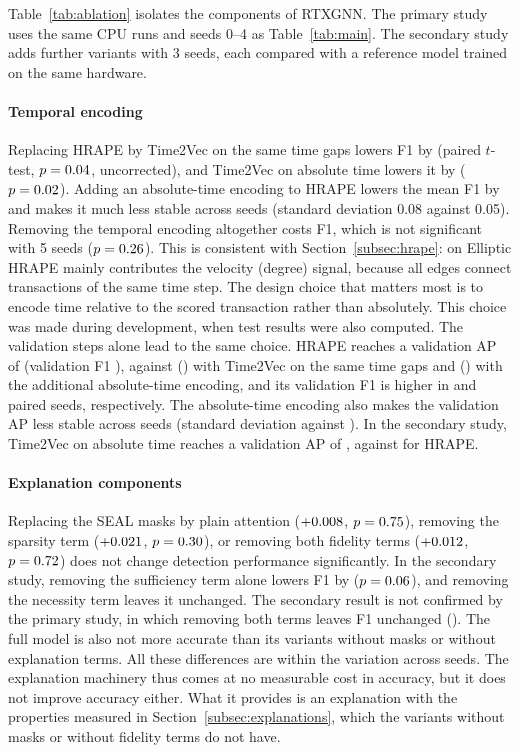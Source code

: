 Table~\ref{tab:ablation} isolates the components of RTXGNN. The primary study uses the same CPU runs and seeds 0--4 as Table~\ref{tab:main}. The secondary study adds further variants with 3 seeds, each compared with a reference model trained on the same hardware.

\paragraph{Temporal encoding} Replacing HRAPE by Time2Vec on the same time gaps lowers F1 by \abltimeTwovecDelta{} (paired $t$-test, $p=0.04$, uncorrected), and Time2Vec on absolute time lowers it by \ablGtimeTwovecabsDelta{} ($p=0.02$). Adding an absolute-time encoding to HRAPE lowers the mean F1 by \ablhrapeabsDelta{} and makes it much less stable across seeds (standard deviation 0.08 against 0.05). Removing the temporal encoding altogether costs \ablnohrapeDelta{} F1, which is not significant with 5 seeds ($p=0.26$). This is consistent with Section~\ref{subsec:hrape}: on Elliptic HRAPE mainly contributes the velocity (degree) signal, because all edges connect transactions of the same time step. The design choice that matters most is to encode time relative to the scored transaction rather than absolutely. This choice was made during development, when test results were also computed. The validation steps alone lead to the same choice. HRAPE reaches a validation AP of \valAPfull{} (validation F1 \valFonefull), against \valAPtimeTwovec{} (\valFonetimeTwovec) with Time2Vec on the same time gaps and \valAPhrapeabs{} (\valFonehrapeabs) with the additional absolute-time encoding, and its validation F1 is higher in \valWinstimeTwovec{} and \valWinshrapeabs{} paired seeds, respectively. The absolute-time encoding also makes the validation AP less stable across seeds (standard deviation \valAPsdhrapeabs{} against \valAPsdfull). In the secondary study, Time2Vec on absolute time reaches a validation AP of \valGAPtimeTwovecabs{}, against \valGAPfull{} for HRAPE.

\paragraph{Explanation components} Replacing the SEAL masks by plain attention ($+0.008$, $p=0.75$), removing the sparsity term ($+0.021$, $p=0.30$), or removing both fidelity terms ($+0.012$, $p=0.72$) does not change detection performance significantly. In the secondary study, removing the sufficiency term alone lowers F1 by \ablGnosufDelta{} ($p=0.06$), and removing the necessity term leaves it unchanged. The secondary result is not confirmed by the primary study, in which removing both terms leaves F1 unchanged (\ablnofidelityDelta). The full model is also not more accurate than its variants without masks or without explanation terms. All these differences are within the variation across seeds. The explanation machinery thus comes at no measurable cost in accuracy, but it does not improve accuracy either. What it provides is an explanation with the properties measured in Section~\ref{subsec:explanations}, which the variants without masks or without fidelity terms do not have.

